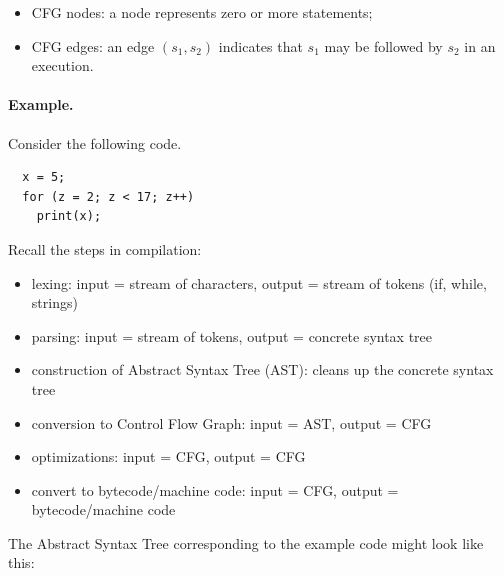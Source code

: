 \documentclass[11pt]{article}
\begin{document}
\begin{itemize}[noitemsep]
\item CFG nodes: a node represents zero or more statements;
\item CFG edges: an edge $(s_1, s_2)$ indicates that $s_1$ may
  be followed by $s_2$ in an execution.
\end{itemize}

\paragraph{Example.} Consider the following code.
\begin{lstlisting}
  x = 5;
  for (z = 2; z < 17; z++)
    print(x);
\end{lstlisting}

Recall the steps in compilation:
\begin{itemize}[noitemsep]
\item lexing: input = stream of characters, output = stream of tokens (if, while, strings)
\item parsing: input = stream of tokens, output = concrete syntax tree
\item construction of Abstract Syntax Tree (AST): cleans up the concrete syntax tree
\item conversion to Control Flow Graph: input = AST, output = CFG
\item optimizations: input = CFG, output = CFG
\item convert to bytecode/machine code: input = CFG, output = bytecode/machine code
\end{itemize}

The Abstract Syntax Tree corresponding to the example code might look like this:

\begin{center}
\end{center}
\end{document}
